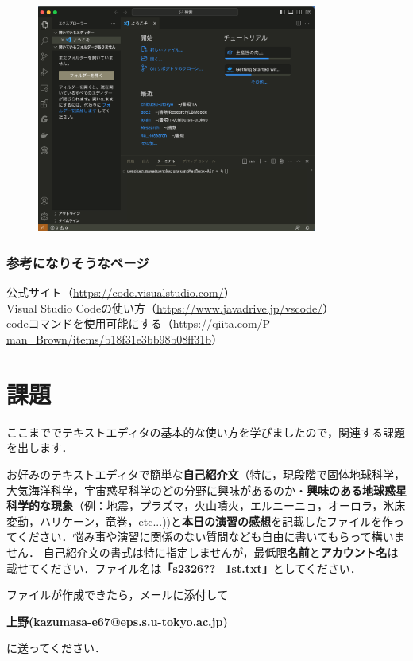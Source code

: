\documentclass{jarticle}
\begin{document}
\begin{figure}[H]
  \centering
  \includegraphics[height=7.5cm]{fig/VSCode6.png}
\end{figure}


\subsubsection{参考になりそうなページ}
\noindent
公式サイト（\url{https://code.visualstudio.com/}）\\
Visual Studio Codeの使い方（\url{https://www.javadrive.jp/vscode/}）\\
codeコマンドを使用可能にする（\url{https://qiita.com/P-man\_Brown/items/b18f31e3bb98b08ff31b}）\\


\section{課題}
ここまででテキストエディタの基本的な使い方を学びましたので，関連する課題を出します．

お好みのテキストエディタで簡単な{\bf 自己紹介文}（特に，現段階で固体地球科学，大気海洋科学，宇宙惑星科学のどの分野に興味があるのか・{\bf 興味のある地球惑星科学的な現象}（例：地震，プラズマ，火山噴火，エルニーニョ，オーロラ，氷床変動，ハリケーン，竜巻，etc...))と{\bf 本日の演習の感想}を記載したファイルを作ってください．悩み事や演習に関係のない質問なども自由に書いてもらって構いません．
自己紹介文の書式は特に指定しませんが，最低限{\bf 名前}と{\bf アカウント名}は載せてください．ファイル名は{\bf 「s2326??\_1st.txt」}としてください．

ファイルが作成できたら，メールに添付して
\begin{center}
{\bf{上野(kazumasa-e67@eps.s.u-tokyo.ac.jp)}}
\end{center}
に送ってください．
\end{document}
